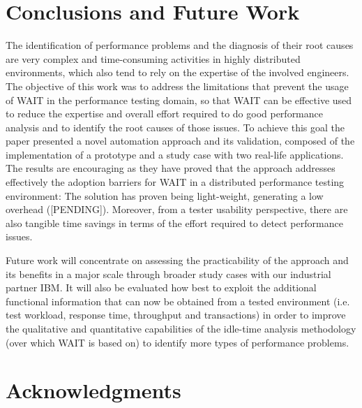 \documentclass[runningheads,a4paper]{llncs}
\begin{document}

\section{Conclusions and Future Work}

The identification of performance problems and the diagnosis of their root
causes are very complex and time-consuming activities in highly distributed
environments, which also tend to rely on the expertise of the involved
engineers. The objective of this work was to address the limitations that
prevent the usage of WAIT in the performance testing domain, so that WAIT can be
effective used to reduce the expertise and overall effort required to do
good performance analysis and to identify the root causes of those issues.
To achieve this goal the paper presented a novel automation approach and its
validation, composed of the implementation of a prototype and a study
case with two real-life applications. The results are encouraging as they have
proved that the approach addresses effectively the adoption barriers for WAIT in 
a distributed performance testing environment: The solution has proven being
light-weight, generating a low overhead ([PENDING]). Moreover, from a tester
usability perspective, there are also tangible time savings in terms of the
effort required to detect performance issues.

Future work will concentrate on assessing the practicability of the
approach and its benefits in a major scale through broader study cases with our
industrial partner IBM. It will also be evaluated how best to exploit the
additional functional information that can now be obtained from a tested environment
(i.e. test workload, response time, throughput and transactions) in order to
improve the qualitative and quantitative capabilities of the idle-time
analysis methodology (over which WAIT is based on) to identify more
types of performance problems.


\section*{Acknowledgments}
\end{document}
